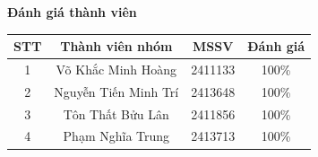 \textbf{\Large Đánh giá thành viên}
\bigskip
\begin{center}
    \begin{tabular}{|c|c|c|c|} \hline 
         \textbf{STT} & \textbf{Thành viên nhóm}& \textbf{MSSV}    & \textbf{Đánh giá} \\ \hline 
        1   & Võ Khắc Minh Hoàng & 2411133 & 100\%  \\ \hline 
        2   & Nguyễn Tiến Minh Trí & 2413648 & 100\% \\ \hline
        3   & Tôn Thất Bửu Lân & 2411856 & 100\%  \\ \hline
        4   & Phạm Nghĩa Trung & 2413713 & 100\% \\ \hline
    
    \end{tabular}
\end{center}
\newpage